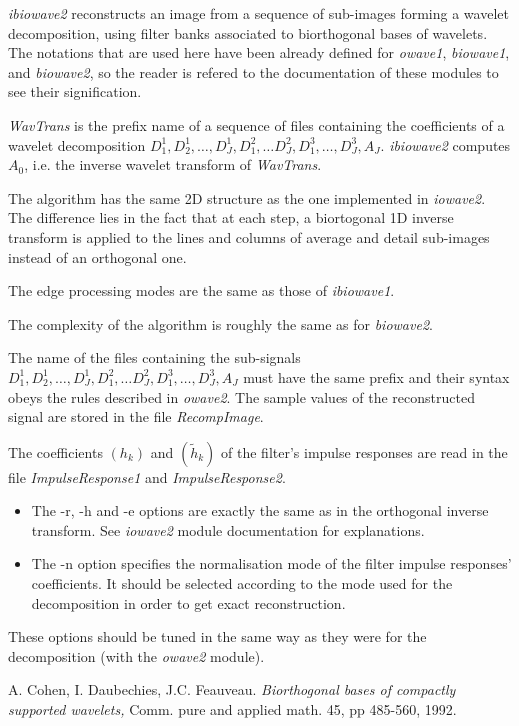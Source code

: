 {\em ibiowave2} reconstructs an image from a sequence of sub-images forming 
a wavelet decomposition, using filter banks associated to biorthogonal bases 
of wavelets. 
The notations that are used here have been already defined for {\em owave1}, 
{\em biowave1}, and {\em biowave2}, so the reader is refered 
to the documentation of these modules to see their signification. 

{\em WavTrans} is the prefix name of a sequence of files containing 
the coefficients of a wavelet decomposition  $D^{1}_{1}, D^{1}_{2}, \ldots, 
D^{1}_{J}, D^{2}_{1}, \ldots D^{2}_{J}, D^{3}_{1}, \ldots, D^{3}_{J}, A_{J}$. 
{\em ibiowave2} computes \( A_{0} \), i.e. the inverse wavelet transform 
of {\em WavTrans}. 

The algorithm has the same 2D structure as the one implemented in 
{\em iowave2}. The difference lies in the fact that at each step, 
a biortogonal 1D inverse transform is applied to the lines and 
columns of average and detail sub-images instead of an orthogonal one. 

The edge processing modes are the same as those of {\em ibiowave1}.

The complexity of the algorithm is roughly the same as for {\em biowave2}.

The name of the files containing the sub-signals 
$D^{1}_{1}, D^{1}_{2}, \ldots, D^{1}_{J}, D^{2}_{1}, \ldots D^{2}_{J}, 
D^{3}_{1}, \ldots, D^{3}_{J}, A_{J}$ must have the same prefix 
and their syntax obeys the rules described in {\em owave2}. 
The sample values of the reconstructed signal are stored in the file 
{\em RecompImage}. 

The coefficients $(h_{k})$ and $(\tilde{h}_{k})$ of the filter's impulse 
responses are read in the file {\em ImpulseResponse1} 
and {\em ImpulseResponse2}.

\begin{itemize}
\item
The -r, -h and -e options are exactly the same as in the orthogonal inverse 
transform. See {\em iowave2} module documentation for explanations. 
\item
The -n option specifies the normalisation mode of the filter impulse 
responses' coefficients. It should be selected according to the mode 
used for the decomposition in order to get exact reconstruction. 
\end{itemize}

These options should be tuned in the same way as they were 
for the decomposition (with the {\em owave2} module). 

\begin{thebibliography}{CDF}

 A. Cohen, I. Daubechies, J.C. Feauveau. 
{\em Biorthogonal bases of compactly supported wavelets, } 
Comm. pure and applied math. 45, pp 485-560, 1992.

\end{thebibliography}
